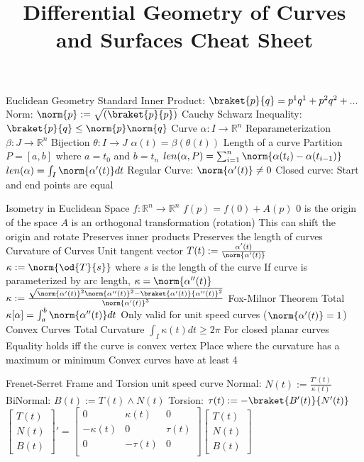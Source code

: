 \documentclass[14pt]{extarticle}
\title{Differential Geometry of Curves and Surfaces Cheat Sheet}
\begin{document}
	\maketitle
	\begin{outline}
		\1	Euclidean Geometry
			\2	Standard Inner Product: $\braket{p}{q} = p^1q^1 + p^2q^2 + ... $
			\2	Norm: $\norm{p} := \sqrt{(\braket{p}{p})}$
			\2	Cauchy Schwarz Inequality: $\braket{p}{q} \le \norm{p}\norm{q}$
		\1	Curve
			\2	$\alpha : I \rightarrow \mathbb{R}^n$
			\2	Reparameterization
				\3	$\beta : J \rightarrow \mathbb{R}^n$
				\3	Bijection $\theta : I \rightarrow J$
				\3	$\alpha(t) = \beta(\theta(t))$
			\2	Length of a curve
				\3	Partition $P = [a,b]$ where $a = t_0$ and $b = t_n$ 
				\3	$len(\alpha,P) = \sum_{i=1}^n \norm{\alpha(t_i) - \alpha(t_{i-1})}$
				\3	$len(\alpha) = \int_{I}\norm{\alpha'(t)}dt$
			\2	Regular Curve: $\norm{\alpha'(t)} \ne 0$
			\2	Closed curve:	Start and end points are equal

		\1	Isometry in Euclidean Space
			\2	$f : \mathbb{R}^n \rightarrow \mathbb{R}^n$
			\2	$f(p) = f(0) + A(p)$
				\3	$0$ is the origin of the space
				\3	$A$ is an orthogonal transformation (rotation)
				\3	This can shift the origin and rotate 
			\2	Preserves inner products
			\2	Preserves the length of curves
		\1	Curvature of Curves
			\2	Unit tangent vector $T(t) := \frac{\alpha'(t)}{\norm{\alpha'(t)}}$
			\2	$\kappa := \norm{\od{T}{s}}$ where $s$ is the length of the curve
			\2	If curve is parameterized by arc length, $\kappa = \norm{\alpha''(t)}$
			\2	$\kappa := \frac{\sqrt{\norm{\alpha'(t)}^2\norm{\alpha''(t)}^2 - 
											\braket{\alpha'(t)}{\alpha''(t)}^2  }}{\norm{\alpha'(t)}^3 }$
			\2	Fox-Milnor Theorem
				\3	Total $\kappa[\alpha] = \int_a^b \norm{\alpha''(t)}dt$
				\3	Only valid for unit speed curves ($\norm{\alpha'(t)} = 1$)
		\1	Convex Curves
			\2	Total Curvature $\int_I \kappa(t) dt \ge 2\pi$
			\2	For closed planar curves
			\2	Equality holds iff the curve is convex
			\2	vertex
				\3	Place where the curvature has a maximum or minimum
				\3	Convex curves have at least 4

		\1	Frenet-Serret Frame and Torsion
			\2	unit speed curve
			\2	Normal: $N(t) := \frac{T'(t)}{\kappa(t)}$
			\2	BiNormal: $B(t) := T(t) \wedge N(t)$	
			\2	Torsion: $\tau(t) := -\braket{B'(t)}{N'(t)}$
			\2	$\begin{bmatrix}
						T(t) \\ N(t) \\ B(t)
					\end{bmatrix}' = 
					\begin{bmatrix}
						0 & \kappa(t) & 0 \\
						-\kappa(t) & 0 & \tau(t) \\
						0 & -\tau(t) & 0 \\
					\end{bmatrix}
					\begin{bmatrix}
						T(t) \\ N(t) \\ B(t)
					\end{bmatrix}$
		

\end{outline}
\end{document}
